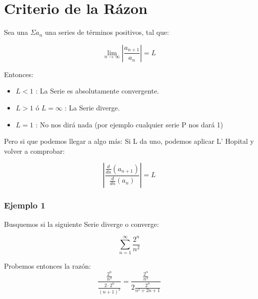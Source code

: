 \documentclass[12pt]{report}                                %
\begin{document}
    \clearpage
    \section{Criterio de la Rázon}

        Sea una $\Sigma a_n$ una series de términos positivos, tal que:

        \begin{equation}
            \lim_{n \to \infty} \left| \frac{a_{n+1}}{a_n} \right| = L
        \end{equation}

        Entonces:
        \begin{itemize}
            \item $L < 1$ : La Serie es absolutamente convergente.
            \item $L > 1$ ó $L = \infty$ : La Serie diverge.
            \item $L = 1$ : No nos dirá nada (por ejemplo cualquier serie P nos dará 1)
        \end{itemize}

        Pero si que podemos llegar a algo más:
        Si L da uno, podemos aplicar L' Hopital y volver a comprobar:

        \begin{equation}
        \left| \frac{\frac{d}{dn} (a_{n+1})}{\frac{d}{dn} (a_n)} \right| = L
        \end{equation}



        \subsubsection{Ejemplo 1}
            Busquemos si la siguiente Serie diverge o converge:

            \begin{equation*}
                \sum_{n=1}^{\infty} \frac{2^n}{n^2}
            \end{equation*}

            Probemos entonces la razón:
            \begin{equation*}
                \frac{ \frac{2^n}{n^2} }{ \frac{2 \cdot 2^n}{(n+1)^2 } } = \frac{ \frac{2^n}{n^2} }{ 2 \frac{2^n}{n^2 + 2n + 1} }
            \end{equation*}
\end{document}
